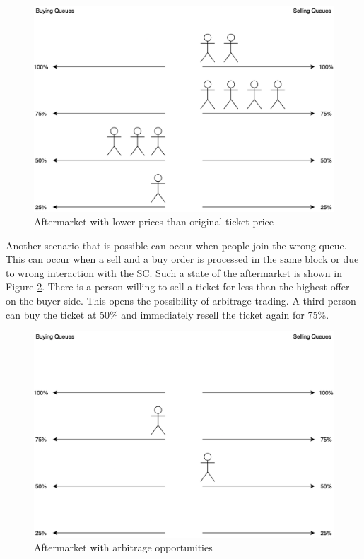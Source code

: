\begin{figure}[H]
    \centering
    \includegraphics[width=12cm]{figures/aftermarket-mixed.png}
    \caption{Aftermarket with lower prices than original ticket price}
    \label{fig:aftermarket-mixed}
\end{figure}

Another scenario that is possible can occur when people join the wrong queue. This can occur when a sell and a buy order is processed in the same block or due to wrong interaction with the SC. Such a state of the aftermarket is shown in Figure \ref{fig:aftermarket-arbitrage}. There is a person willing to sell a ticket for less than the highest offer on the buyer side. This opens the possibility of arbitrage trading. A third person can buy the ticket at 50\% and immediately resell the ticket again for 75\%. 

\begin{figure}[H]
    \centering
    \includegraphics[width=12cm]{figures/aftermarket-arbitrage.png}
    \caption{Aftermarket with arbitrage opportunities}
    \label{fig:aftermarket-arbitrage}
\end{figure}

